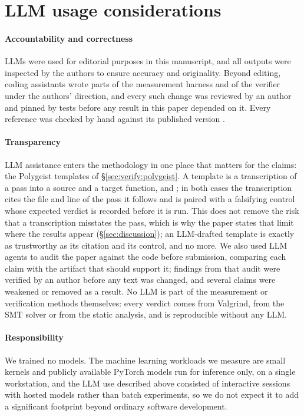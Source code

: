 \section*{LLM usage considerations}

\paragraph{Accountability and correctness}
LLMs were used for editorial purposes in this manuscript, and all outputs were inspected by the authors to ensure accuracy and originality.
Beyond editing, coding assistants  wrote parts of the measurement harness and of the verifier under the authors' direction, and every such change was reviewed by an author and pinned by tests before any result in this paper depended on it.
Every reference was checked by hand against its published version .

\paragraph{Transparency}
LLM assistance enters the methodology in one place that matters for the claims: the Polygeist templates of \S\ref{sec:verify:polygeist}.
A template is a transcription of a pass into a source and a target function, and ; in both cases the transcription cites the file and line of the pass it follows and is paired with a falsifying control whose expected verdict is recorded before it is run.
This does not remove the risk that a transcription misstates the pass, which is why the paper states that limit where the results appear (\S\ref{sec:discussion}); an LLM-drafted template is exactly as trustworthy as its citation and its control, and no more.
We also used LLM agents to audit the paper against the code before submission, comparing each claim with the artifact that should support it; findings from that audit were verified by an author before any text was changed, and several claims were weakened or removed as a result.
No LLM is part of the measurement or verification methods themselves: every verdict comes from Valgrind, from the SMT solver or from the static analysis, and is reproducible without any LLM.

\paragraph{Responsibility}
We trained no models.
The machine learning workloads we measure are small kernels and publicly available PyTorch models run for inference only, on a single workstation, and the LLM use described above consisted of interactive sessions with hosted models rather than batch experiments, so we do not expect it to add a significant footprint beyond ordinary software development.
